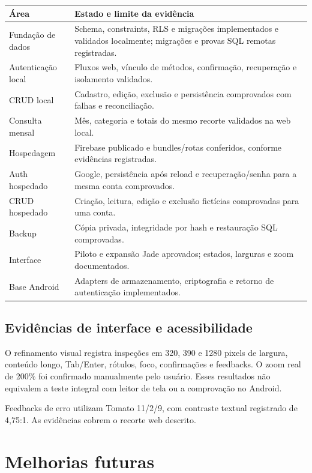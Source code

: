 \documentclass[
    12pt,
    oneside,
    a4paper,
    brazil
]{abntex2}
\begin{document}
\begin{longtable}{@{}p{}p{}@{}}
\toprule
\textbf{Área} & \textbf{Estado e limite da evidência} \\
\midrule
\endhead
Fundação de dados & Schema, constraints, RLS e migrações implementados e validados localmente; migrações e provas SQL remotas registradas. \\
Autenticação local & Fluxos web, vínculo de métodos, confirmação, recuperação e isolamento validados. \\
CRUD local & Cadastro, edição, exclusão e persistência comprovados com falhas e reconciliação. \\
Consulta mensal & Mês, categoria e totais do mesmo recorte validados na web local. \\
Hospedagem & Firebase publicado e bundles/rotas conferidos, conforme evidências registradas. \\
Auth hospedado & Google, persistência após reload e recuperação/senha para a mesma conta comprovados. \\
CRUD hospedado & Criação, leitura, edição e exclusão fictícias comprovadas para uma conta. \\
Backup & Cópia privada, integridade por hash e restauração SQL comprovadas. \\
Interface & Piloto e expansão Jade aprovados; estados, larguras e zoom documentados. \\
Base Android & Adapters de armazenamento, criptografia e retorno de autenticação implementados. \\
\bottomrule
\end{longtable}

\section{Evidências de interface e acessibilidade}

O refinamento visual registra inspeções em 320, 390 e 1280 pixels de largura, conteúdo longo, Tab/Enter, rótulos, foco, confirmações e feedbacks. O zoom real de 200\% foi confirmado manualmente pelo usuário. Esses resultados não equivalem a teste integral com leitor de tela ou a comprovação no Android.

Feedbacks de erro utilizam Tomato 11/2/9, com contraste textual registrado de 4,75:1. As evidências cobrem o recorte web descrito.

\chapter{Melhorias futuras}
\end{document}
